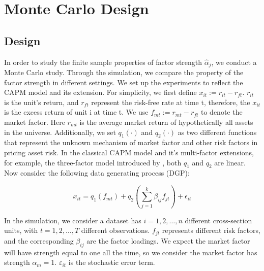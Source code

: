 

	\section{Monte Carlo Design}\label{MC}
	\subsection{Design}
In order to study the finite sample properties of factor strength $\hat{\alpha}_j$, we conduct a Monte Carlo study.
Through the simulation, we compare the property of the factor strength in different settings.
We set up the experiments to reflect the CAPM model and its extension.
For simplicity, we first define $x_{it} := r_{it}- r_{ft}$.
$r_{it}$ is the unit's return, and $r_{ft}$ represent the risk-free rate at time t, therefore, the $x_{it}$ is the excess return of unit i at time t.
We use $f_{mt}:=r_{mt} - r_{ft}$ to denote the market factor.
Here $r_{mt}$ is the average market return of hypothetically all assets in the universe.
Additionally, we set $q_1(\cdot)$ and $q_2(\cdot)$ as two different functions that represent the unknown mechanism of market factor and other risk factors in pricing asset risk.
In the classical CAPM model and it's multi-factor extensions, for example, the three-factor model introduced by , both $q_1$ and $q_2$ are linear.
Now consider the following data generating process (DGP):

	
	\[ x_{it} = q_1(f_{mt}) + q_2( \sum_{j=1}^k\beta_{ij}f_{jt}) +\epsilon_{it}  \]


In the simulation, we consider a dataset has $i = 1, 2,\dots, n$ different cross-section units, with $t= 1, 2,\dots, T$ different observations. 
$f_{jt}$ represents different risk factors, and the corresponding  $\beta_{ij}$ are the factor loadings.
We expect the market factor will have strength equal to one all the time, so we consider the market factor has strength $\alpha_m = 1$.
$\varepsilon_{it}$ is the stochastic error term.

